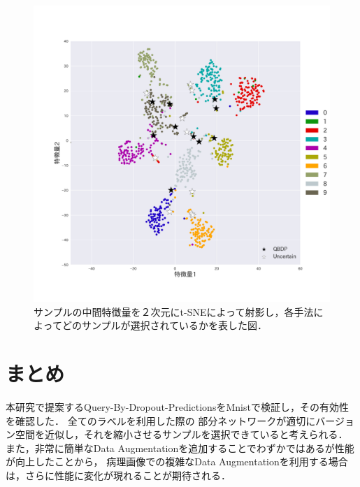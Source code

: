 \begin{figure}[h]
    \begin{center}
     \includegraphics[width=12cm]{figures/mnist_scatter.pdf}
    \end{center}
   \caption{\label{fig:mnist_scatter}サンプルの中間特徴量を２次元にt-SNEによって射影し，各手法によってどのサンプルが選択されているかを表した図．}
\end{figure}

\clearpage

\section{まとめ}
本研究で提案するQuery-By-Dropout-PredictionsをMnistで検証し，その有効性を確認した．
全てのラベルを利用した際の
部分ネットワークが適切にバージョン空間を近似し，それを縮小させるサンプルを選択できていると考えられる．
また，非常に簡単なData Augmentationを追加することでわずかではあるが性能が向上したことから，
病理画像での複雑なData Augmentationを利用する場合は，さらに性能に変化が現れることが期待される．
